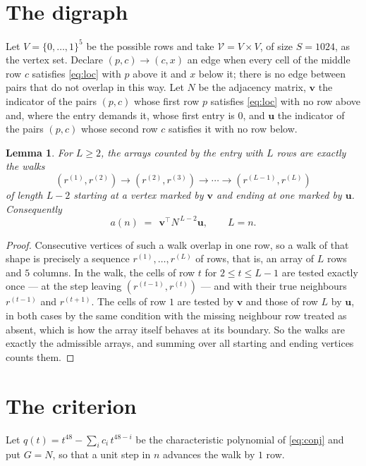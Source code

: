 \documentclass[11pt,a4paper]{article}
\theoremstyle{plain}
\newtheorem{lemma}[theorem]{Lemma}
\theoremstyle{definition}
\begin{document}
\section{The digraph}

Let $V=\{0,\dots,1\}^{5}$ be the possible rows and take
$\mathcal V=V\times V$, of size $S=1024$, as the vertex set. Declare $(p,c)\to(c,x)$ an edge
when every cell of the middle row $c$ satisfies \eqref{eq:loc} with $p$ above it and $x$
below it; there is no edge between pairs that do not overlap in this way. Let $N$ be the
adjacency matrix, $\mathbf{v}$ the indicator of the pairs $(p,c)$ whose first row $p$
satisfies \eqref{eq:loc} with no row above and, where the entry demands it, whose first entry is $0$, and $\mathbf{u}$ the indicator of
the pairs $(p,c)$ whose second row $c$ satisfies it with no row below.

\begin{lemma}\label{lem:walk}
For $L\ge2$, the arrays counted by the entry with $L$ rows are exactly the walks
\[
(r^{(1)},r^{(2)})\to(r^{(2)},r^{(3)})\to\cdots\to(r^{(L-1)},r^{(L)})
\]
of length $L-2$ starting at a vertex marked by $\mathbf{v}$ and ending at one marked by
$\mathbf{u}$. Consequently
\[
a(n)\;=\;\,\mathbf{v}^{\!\top}N^{\,L-2}\mathbf{u},\qquad L=n .
\]
\end{lemma}

\begin{proof}
Consecutive vertices of such a walk overlap in one row, so a walk of that shape is
precisely a sequence $r^{(1)},\dots,r^{(L)}$ of rows, that is, an array of $L$ rows
and $5$ columns. In the walk, the cells of row $t$ for $2\le t\le L-1$ are tested
exactly once --- at the step leaving $(r^{(t-1)},r^{(t)})$ --- and with their true
neighbours $r^{(t-1)}$ and $r^{(t+1)}$. The cells of row $1$ are tested by
$\mathbf{v}$ and those of row $L$ by $\mathbf{u}$, in both cases by the same condition
with the missing neighbour row treated as absent, which is how the array itself behaves at
its boundary. So the walks are exactly the admissible arrays, and summing over all starting
and ending vertices counts them.
\end{proof}

\section{The criterion}

Let $q(t)=t^{48}-\sum_i c_i\,t^{48-i}$ be the characteristic polynomial of
\eqref{eq:conj} and put $G=N$, so that a unit step in $n$ advances the walk by
$1$ row.
\end{document}
